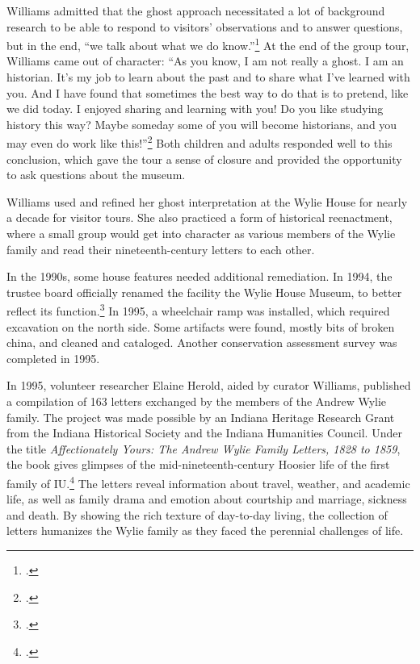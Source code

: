 \documentclass[
  american,
  letterpaper,
]{scrreprt}
\begin{document}
Williams admitted that the ghost approach necessitated a lot of
background research to be able to respond to visitors' observations and
to answer questions, but in the end, ``we talk about what we do
know.''\footnote{.} At the end of the
group tour, Williams came out of character: ``As you know, I am not
really a ghost. I am an historian. It's my job to learn about the past
and to share what I've learned with you. And I have found that sometimes
the best way to do that is to pretend, like we did today. I enjoyed
sharing and learning with you! Do you like studying history this way?
Maybe someday some of you will become historians, and you may even do
work like this!''\footnote{.} Both
children and adults responded well to this conclusion, which gave the
tour a sense of closure and provided the opportunity to ask questions
about the museum.

Williams used and refined her ghost interpretation at the Wylie House
for nearly a decade for visitor tours. She also practiced a form of
historical reenactment, where a small group would get into character as
various members of the Wylie family and read their nineteenth-century
letters to each other.

In the 1990s, some house features needed additional remediation. In
1994, the trustee board officially renamed the facility the Wylie House
Museum, to better reflect its function.\footnote{.}
In 1995, a wheelchair ramp was installed, which required excavation on
the north side. Some artifacts were found, mostly bits of broken china,
and cleaned and cataloged. Another conservation assessment survey was
completed in 1995.

In 1995, volunteer researcher Elaine Herold, aided by curator Williams,
published a compilation of 163 letters exchanged by the members of the
Andrew Wylie family. The project was made possible by an Indiana
Heritage Research Grant from the Indiana Historical Society and the
Indiana Humanities Council. Under the title \emph{Affectionately Yours:
The Andrew Wylie Family Letters, 1828 to 1859}, the book gives glimpses
of the mid-nineteenth-century Hoosier life of the first family of
IU.\footnote{.} The letters reveal information about travel, weather,
and academic life, as well as family drama and emotion about courtship
and marriage, sickness and death. By showing the rich texture of
day-to-day living, the collection of letters humanizes the Wylie family
as they faced the perennial challenges of life.
\end{document}
